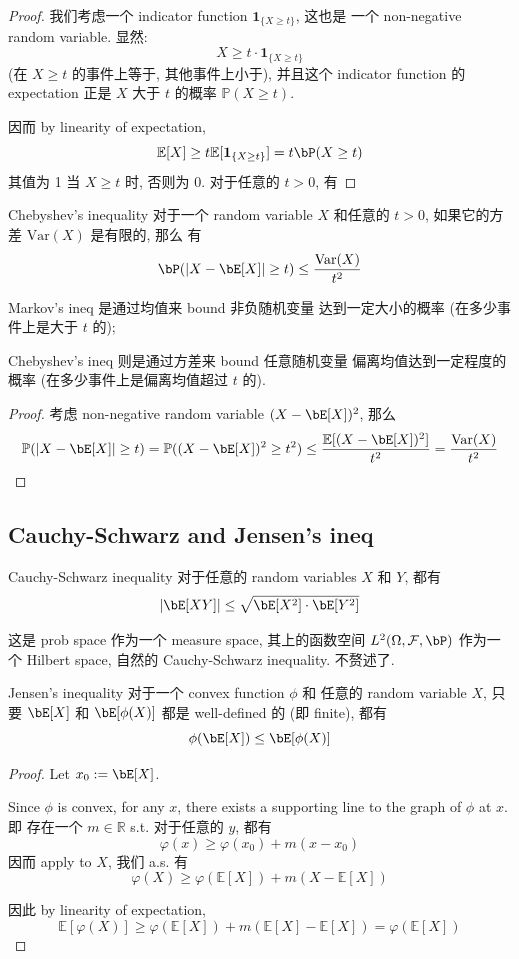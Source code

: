 \begin{proof}
我们考虑一个 indicator function $\mathbf{1}_{\{X \ge t\}}$, 这也是
一个 non-negative random variable. 
显然:
$$ 
X \geq t \cdot \mathbf{1}_{\{X \ge t\}}
 $$
 (在 $X \ge t$ 的事件上等于, 其他事件上小于), 并且这个 indicator function
 的 expectation 正是 $X$ 大于 $t$ 的概率 $\mathbb{P}(X \ge t)$. 
 
因而 by linearity of expectation,
 $$ 
 \mathbb{E}[X] \geq t \mathbb{E}[\mathbf{1}_{\{X \ge t\}}] = t \bP(X \ge t)
  $$
其值为 1 当 $X \ge t$ 时, 否则为 0.
    对于任意的 $t > 0$, 有
\end{proof}



\begin{corollary}{Chebyshev's inequality}
对于一个 random variable \(X\) 和任意的 \(t > 0\), 
如果它的方差 $\text{Var}(X)$ 是有限的, 那么
有
\[
\bP(|X - \bE[X]| \ge t) \le \frac{\text{Var}(X)}{t^2}
\]
\end{corollary}
\begin{remark}
Markov's ineq 是通过均值来 bound 非负随机变量
达到一定大小的概率 (在多少事件上是大于 $t$ 的);

Chebyshev's ineq 则是通过方差来 bound 任意随机变量
偏离均值达到一定程度的概率 (在多少事件上是偏离均值超过 $t$ 的).
\end{remark}
\begin{proof}
考虑 non-negative random variable $(X - \bE[X])^2$,
那么 
$$ 
\mathbb{P}(|X-\bE[X]| \ge t) = \mathbb{P}((X - \bE[X])^2 \ge t^2)
\leq \frac{\mathbb{E}[(X - \bE[X])^2]}{t^2} =
 \frac{\text{Var}(X)}{t^2}
 $$
\end{proof}

\subsection{Cauchy-Schwarz and Jensen's ineq}
\begin{theorem}{Cauchy-Schwarz inequality}
对于任意的 random variables \(X\) 和 \(Y\), 都有
\[
|\bE[XY]| \le \sqrt{\bE[X^2] \cdot \bE[Y^2]}
\]
\end{theorem}
这是 prob space 作为一个 measure space, 
其上的函数空间 
\(L^2(\Omega, \mathcal{F}, \bP)\) 
作为一个 Hilbert space, 自然的 Cauchy-Schwarz inequality.
不赘述了.

\begin{theorem}{Jensen's inequality}
对于一个 convex function \(\phi\) 和
任意的 random variable \(X\), 
只要 \(\bE[X]\) 和 \(\bE[\phi(X)]\) 都是 well-defined 的 (即 finite),
都有
\[
\phi(\bE[X]) \le \bE[\phi(X)]
\]
\end{theorem}
\begin{proof}
Let $x_0 := \bE[X]$.

Since \(\phi\) is convex, 
for any \(x\), there exists a supporting 
line to the graph of \(\phi\) at \(x\). 即
存在一个 $m\in \mathbb{R}$ s.t. 对于任意的 $y$, 都有
$$
\varphi(x) \geq \varphi\left(x_0\right)+m\left(x-x_0\right)
$$
因而 apply to $X$,
我们 a.s. 有
$$ \varphi(X) \geq \varphi(\mathbb{E}[X])+m(X-\mathbb{E}[X]) $$

因此 by linearity of expectation,
$$ 
\mathbb{E}[\varphi(X)] \geq \varphi(\mathbb{E}[X])+m(\mathbb{E}[X]-\mathbb{E}[X])=\varphi(\mathbb{E}[X])
$$
\end{proof}

